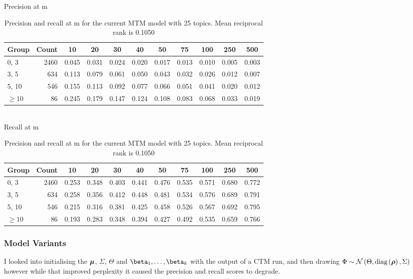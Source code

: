 \begin{table}{\small
Precision at m\\
\begin{tabular}{| l | r || c | c | c | c | c | c | c | c | c |}\hline
 Group    & Count &    10 &    20 &    30 &    40 &    50 &    75 &   100 &   250 &   500  \\
\hline
  0,    3 &      2460 & 0.045 & 0.031 & 0.024 & 0.020 & 0.017 & 0.013 & 0.010 & 0.005 & 0.003  \\
  3,    5 &       634 & 0.113 & 0.079 & 0.061 & 0.050 & 0.043 & 0.032 & 0.026 & 0.012 & 0.007  \\
  5,   10 &       546 & 0.155 & 0.113 & 0.092 & 0.077 & 0.066 & 0.051 & 0.041 & 0.020 & 0.012  \\
 $\geq 10$ &        86 & 0.245 & 0.179 & 0.147 & 0.124 & 0.108 & 0.083 & 0.068 & 0.033 & 0.019  \\
\hline\end{tabular}\\

Recall at m\\
\begin{tabular}{| l | r || c | c | c | c | c | c | c | c | c |}\hline
 Group    & Count &    10 &    20 &    30 &    40 &    50 &    75 &   100 &   250 &   500  \\ \hline
  0,    3 &      2460 & 0.253 & 0.348 & 0.403 & 0.441 & 0.476 & 0.535 & 0.571 & 0.680 & 0.772  \\
  3,    5 &       634 & 0.258 & 0.356 & 0.412 & 0.448 & 0.481 & 0.534 & 0.576 & 0.689 & 0.791  \\
  5,   10 &       546 & 0.215 & 0.316 & 0.381 & 0.425 & 0.458 & 0.526 & 0.567 & 0.692 & 0.795  \\
 $\geq 10$ &        86 & 0.193 & 0.283 & 0.348 & 0.394 & 0.427 & 0.492 & 0.535 & 0.659 & 0.766  \\
\hline\end{tabular}
\caption{Precision and recall at m for the current MTM model with 25 topics. Mean reciprocal rank is 0.1050}\label{tbl:mtm-new}
}\end{table}


\subsubsection*{Model Variants}
I looked into initialising the $\bm \mu$, $\Sigma$, $\Theta$ and $\vv{\beta}_1, \ldots, \vv{\beta}_k$ with the output of a CTM run, and then drawing $\Phi \sim \mathcal{N} \left(\Theta, \text{diag} \left( {\bm \rho} \right), \Sigma\right)$ however while that improved perplexity it caused the precision and recall scores to degrade.

